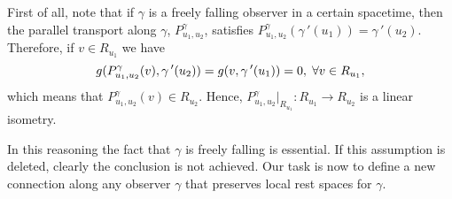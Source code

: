 \documentclass[11pt]{book}
\begin{document}
First of all, note that if $\gamma$ is a freely falling observer in a certain spacetime, then the parallel transport along $\gamma$, $P_{u_1,u_2}^\gamma$, satisfies $P_{u_1,u_2}^\gamma(\gamma{\,'}(u_1))=\gamma{\,'}(u_2)$. Therefore, if $v\in R_{u_1}$ we have
\[
g(P_{u_1,u_2}^\gamma(v),\gamma{\,'}(u_2))=g(v,\gamma{\,'}(u_1))=0,\hspace{1mm} \forall v\in R_{u_1},
\] 
which means that $P_{u_1,u_2}^\gamma(v)\in R_{u_2}$. Hence, $P_{u_1,u_2}^\gamma|_{R_{u_1}}:R_{u_1}\to R_{u_2}$ is a linear isometry.	
		
In this reasoning the fact that $\gamma$ is freely falling is essential. If this assumption is deleted, clearly the conclusion is not achieved. Our task is now to define a new connection along any observer $\gamma$ that preserves local rest spaces for $\gamma$.  
\end{document}

